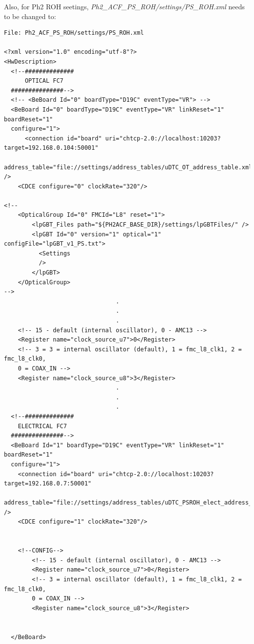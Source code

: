 \documentclass[10pt,a4paper]{article}
\begin{document}
\newpage

Also, for Ph2 ROH seetings, \emph{Ph2\_ACF\_PS\_ROH/settings/PS\_ROH.xml} needs to be changed to:

\begin{framed}
\begin{verbatim}
File: Ph2_ACF_PS_ROH/settings/PS_ROH.xml

<?xml version="1.0" encoding="utf-8"?>
<HwDescription>
  <!--##############
      OPTICAL FC7
  ###############-->
  <!-- <BeBoard Id="0" boardType="D19C" eventType="VR"> -->
  <BeBoard Id="0" boardType="D19C" eventType="VR" linkReset="1" boardReset="1"
  configure="1">
      <connection id="board" uri="chtcp-2.0://localhost:10203?target=192.168.0.104:50001" 
      address_table="file://settings/address_tables/uDTC_OT_address_table.xml" />
    <CDCE configure="0" clockRate="320"/>

<!--
    <OpticalGroup Id="0" FMCId="L8" reset="1">
        <lpGBT_Files path="${PH2ACF_BASE_DIR}/settings/lpGBTFiles/" />
        <lpGBT Id="0" version="1" optical="1" configFile="lpGBT_v1_PS.txt">
          <Settings
          />
        </lpGBT>
    </OpticalGroup>
-->
                                .
                                .
                                .                                
    <!-- 15 - default (internal oscillator), 0 - AMC13 -->
    <Register name="clock_source_u7">0</Register>
    <!-- 3 = 3 = internal oscillator (default), 1 = fmc_l8_clk1, 2 = fmc_l8_clk0, 
    0 = COAX_IN -->
    <Register name="clock_source_u8">3</Register>   
                                .
                                .
                                .
  <!--##############
    ELECTRICAL FC7
  ###############-->
  <BeBoard Id="1" boardType="D19C" eventType="VR" linkReset="1" boardReset="1" 
  configure="1">
    <connection id="board" uri="chtcp-2.0://localhost:10203?target=192.168.0.7:50001" 
    address_table="file://settings/address_tables/uDTC_PSROH_elect_address_table.xml" />
    <CDCE configure="1" clockRate="320"/>


    <!--CONFIG-->
        <!-- 15 - default (internal oscillator), 0 - AMC13 -->
        <Register name="clock_source_u7">0</Register>
        <!-- 3 = internal oscillator (default), 1 = fmc_l8_clk1, 2 = fmc_l8_clk0,
        0 = COAX_IN -->
        <Register name="clock_source_u8">3</Register>


  </BeBoard>


\end{verbatim}
\end{framed}
\end{document}
